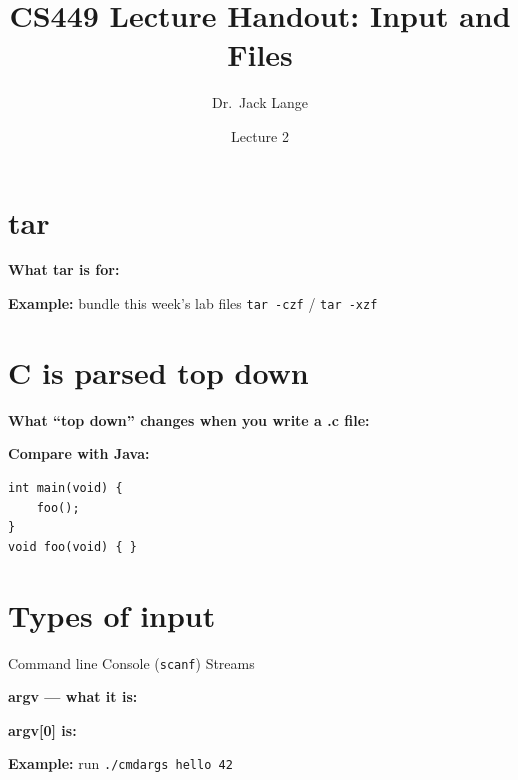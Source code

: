 \documentclass[12pt]{article}
\title{CS449 Lecture Handout: Input and Files}
\author{Dr.\ Jack Lange}
\date{Lecture 2}
\begin{document}
\maketitle

\section*{tar}

\Needspace{0.22\textheight}
\noindent\textbf{What tar is for:}
\vspace{0.14\textheight}

\Needspace{0.16\textheight}
\noindent\textbf{Example:} bundle this week's lab files \quad\texttt{tar -czf} / \texttt{tar -xzf}
\vspace{0.10\textheight}

\section*{C is parsed top down}

\Needspace{0.30\textheight}
\noindent\textbf{What ``top down'' changes when you write a .c file:}
\vspace{0.22\textheight}

\Needspace{0.30\textheight}
\noindent\textbf{Compare with Java:}
\vspace{0.22\textheight}

\Needspace{0.28\textheight}
\begin{lstlisting}
int main(void) {
    foo();
}
void foo(void) { }
\end{lstlisting}
\vspace{0.12\textheight}

\newpage
\section*{Types of input}

\noindent Command line \hspace{3.5em} Console (\texttt{scanf}) \hspace{3.5em} Streams

\Needspace{0.22\textheight}
\noindent\textbf{argv --- what it is:}
\vspace{0.14\textheight}

\Needspace{0.14\textheight}
\noindent\textbf{argv[0] is:}
\vspace{0.10\textheight}

\Needspace{0.14\textheight}
\noindent\textbf{Example:} run \texttt{./cmdargs hello 42}
\vspace{0.08\textheight}
\end{document}
